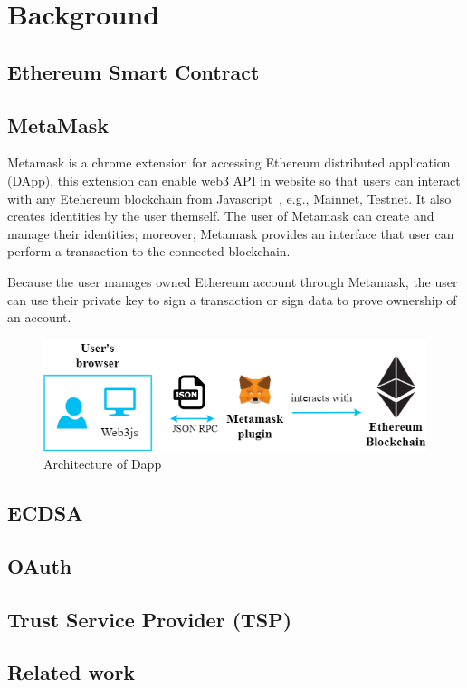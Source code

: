 \chapter{Background}
\label{chapter:background}

\section{Ethereum Smart Contract}

\newpage
\section{MetaMask}
Metamask is a chrome extension for accessing Ethereum distributed application (DApp), this extension can enable web3 API in website so that users can interact with any Etehereum blockchain from Javascript~\cite{web3.js}, e.g., Mainnet, Testnet. It also creates identities by the user themself. The user of Metamask can create and manage their identities; moreover, Metamask provides an interface that user can perform a transaction to the connected blockchain.\par
Because the user manages owned Ethereum account through Metamask, the user can use their private key to sign a transaction or sign data to prove ownership of an account.\par


\begin{figure}[hb]
    \centering
    \includegraphics[height=!,width=1\linewidth,keepaspectratio=true]{figures/architecture_of_dapp.png}
    \caption{{\footnotesize Architecture of Dapp}}
    \label{fig:architecture_of_dapp}
\end{figure}

\section{ECDSA}
\newpage
\section{OAuth}

\section{Trust Service Provider (TSP)}

\section{Related work}
